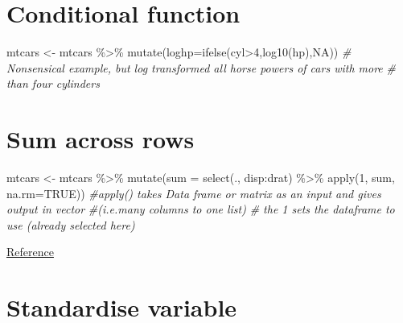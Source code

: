 \documentclass[
]{book}
\newenvironment{Shaded}{\begin{snugshade}}{\end{snugshade}}
\newcommand{\AttributeTok}[1]{\textcolor[rgb]{0.77,0.63,0.00}{#1}}
\newcommand{\CommentTok}[1]{\textcolor[rgb]{0.56,0.35,0.01}{\textit{#1}}}
\newcommand{\ConstantTok}[1]{\textcolor[rgb]{0.00,0.00,0.00}{#1}}
\newcommand{\DecValTok}[1]{\textcolor[rgb]{0.00,0.00,0.81}{#1}}
\newcommand{\FunctionTok}[1]{\textcolor[rgb]{0.00,0.00,0.00}{#1}}
\newcommand{\NormalTok}[1]{#1}
\newcommand{\OtherTok}[1]{\textcolor[rgb]{0.56,0.35,0.01}{#1}}
\newcommand{\SpecialCharTok}[1]{\textcolor[rgb]{0.00,0.00,0.00}{#1}}
\begin{document}
\hypertarget{conditional-function}{%
\section{Conditional function}\label{conditional-function}}

\begin{Shaded}
\begin{Highlighting}[]
\NormalTok{mtcars }\OtherTok{\textless{}{-}}\NormalTok{ mtcars }\SpecialCharTok{\%\textgreater{}\%} \FunctionTok{mutate}\NormalTok{(}\AttributeTok{loghp=}\FunctionTok{ifelse}\NormalTok{(cyl}\SpecialCharTok{\textgreater{}}\DecValTok{4}\NormalTok{,}\FunctionTok{log10}\NormalTok{(hp),}\ConstantTok{NA}\NormalTok{)) }
\CommentTok{\# Nonsensical example, but log transformed all horse powers of cars with more}
\CommentTok{\# than four cylinders}
\end{Highlighting}
\end{Shaded}

\hypertarget{sum-across-rows}{%
\section{Sum across rows}\label{sum-across-rows}}

\begin{Shaded}
\begin{Highlighting}[]
\NormalTok{mtcars }\OtherTok{\textless{}{-}}\NormalTok{ mtcars }\SpecialCharTok{\%\textgreater{}\%}  \FunctionTok{mutate}\NormalTok{(}\AttributeTok{sum =} \FunctionTok{select}\NormalTok{(., disp}\SpecialCharTok{:}\NormalTok{drat) }\SpecialCharTok{\%\textgreater{}\%} 
\FunctionTok{apply}\NormalTok{(}\DecValTok{1}\NormalTok{, sum, }\AttributeTok{na.rm=}\ConstantTok{TRUE}\NormalTok{))}
\CommentTok{\#apply() takes Data frame or matrix as an input and gives output in vector }
\CommentTok{\#(i.e.many columns to one list)}
\CommentTok{\# the \textquotesingle{}1\textquotesingle{} sets the dataframe to use (already selected here)}
\end{Highlighting}
\end{Shaded}

\href{https://stackoverflow.com/questions/28873057/sum-across-multiple-columns-with-dplyr}{Reference}

\hypertarget{standardise-variable}{%
\section{Standardise variable}\label{standardise-variable}}
\end{document}
